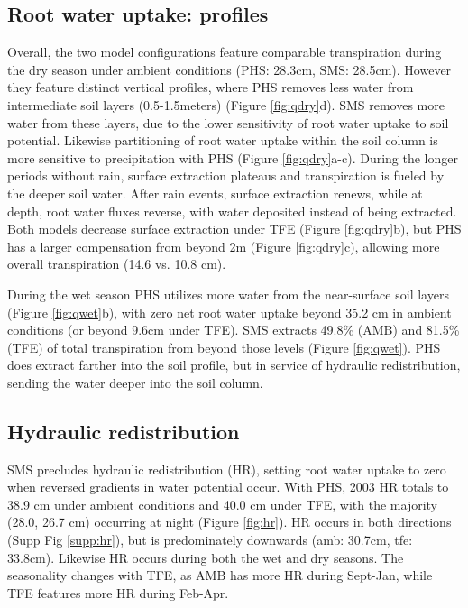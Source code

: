 \documentclass[draft,linenumbers]{agujournal}
\begin{document}
\subsection{Root water uptake: profiles}
    Overall, the two model configurations feature comparable transpiration during the dry season under ambient conditions (PHS: 28.3cm, SMS: 28.5cm).
    However they feature distinct vertical profiles, where PHS removes less water from intermediate soil layers (0.5-1.5meters) (Figure \ref{fig:qdry}d).
    SMS removes more water from these layers, due to the lower sensitivity of root water uptake to soil potential.
    Likewise partitioning of root water uptake within the soil column is more sensitive to precipitation with PHS (Figure \ref{fig:qdry}a-c).
    During the longer periods without rain, surface extraction plateaus and transpiration is fueled by the deeper soil water.
    After rain events, surface extraction renews, while at depth, root water fluxes reverse, with water deposited instead of being extracted.
    Both models decrease surface extraction under TFE (Figure \ref{fig:qdry}b), but PHS has a larger compensation from beyond 2m (Figure \ref{fig:qdry}c),
    allowing more overall transpiration (14.6 vs. 10.8 cm).
    
    During the wet season PHS utilizes more water from the near-surface soil layers (Figure \ref{fig:qwet}b), 
    with zero net root water uptake beyond 35.2 cm in ambient conditions (or beyond 9.6cm under TFE).
    SMS extracts 49.8\% (AMB) and 81.5\% (TFE) of total transpiration from beyond those levels (Figure \ref{fig:qwet}). 
    PHS does extract farther into the soil profile, but in service of hydraulic redistribution, 
    sending the water deeper into the soil column.
        
\subsection{Hydraulic redistribution}
    SMS precludes hydraulic redistribution (HR), setting root water uptake to zero when reversed gradients in water potential occur.
    With PHS, 2003 HR totals to 38.9 cm under ambient conditions and 40.0 cm under TFE, with the majority (28.0, 26.7 cm) occurring at night (Figure \ref{fig:hr}).
    HR occurs in both directions (Supp Fig \ref{supp:hr}), but is predominately downwards (amb: 30.7cm, tfe: 33.8cm).
    Likewise HR occurs during both the wet and dry seasons.
    The seasonality changes with TFE, as AMB has more HR during Sept-Jan, while TFE features more HR during Feb-Apr.
\end{document}
